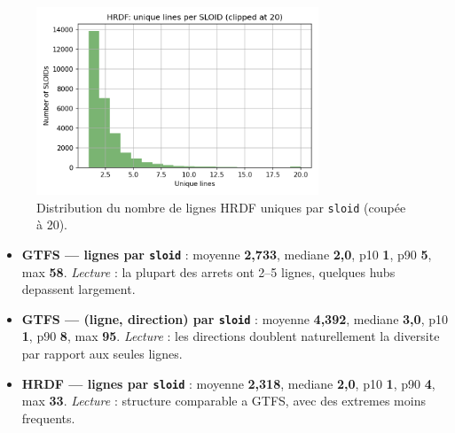 \begin{figure}[H]
  \centering
  \includegraphics[width=0.75\textwidth]{../figures/chap4/hist_hrdf_lines_per_sloid.png}
  \caption{Distribution du nombre de lignes HRDF uniques par \texttt{sloid} (coupée à 20).}
\end{figure}


\begin{itemize}
  \item \textbf{GTFS --- lignes par \texttt{sloid}} : moyenne \textbf{2,733}, mediane \textbf{2,0}, p10 \textbf{1}, p90 \textbf{5}, max \textbf{58}. \emph{Lecture} : la plupart des arrets ont 2--5 lignes, quelques hubs depassent largement.
  \item \textbf{GTFS --- (ligne, direction) par \texttt{sloid}} : moyenne \textbf{4,392}, mediane \textbf{3,0}, p10 \textbf{1}, p90 \textbf{8}, max \textbf{95}. \emph{Lecture} : les directions doublent naturellement la diversite par rapport aux seules lignes.
  \item \textbf{HRDF --- lignes par \texttt{sloid}} : moyenne \textbf{2,318}, mediane \textbf{2,0}, p10 \textbf{1}, p90 \textbf{4}, max \textbf{33}. \emph{Lecture} : structure comparable a GTFS, avec des extremes moins frequents.
\end{itemize}

